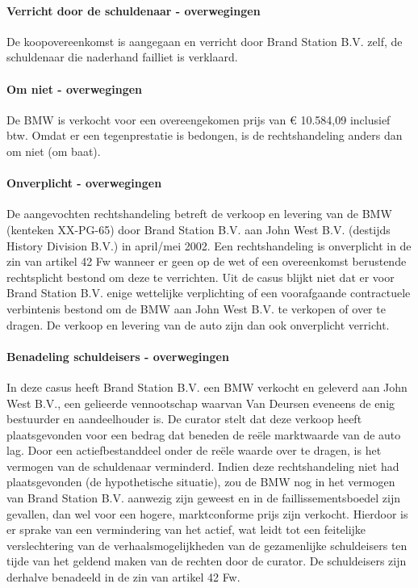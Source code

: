 \documentclass[
  dutch,
  a4paper,
]{article}
\begin{document}
\paragraph{Verricht door de schuldenaar - overwegingen}\label{verricht-door-de-schuldenaar---overwegingen-59}

De koopovereenkomst is aangegaan en verricht door Brand Station B.V. zelf, de schuldenaar die naderhand failliet is verklaard.

\paragraph{Om niet - overwegingen}\label{om-niet---overwegingen-59}

De BMW is verkocht voor een overeengekomen prijs van € 10.584,09 inclusief btw. Omdat er een tegenprestatie is bedongen, is de rechtshandeling anders dan om niet (om baat).

\paragraph{Onverplicht - overwegingen}\label{onverplicht---overwegingen-59}

De aangevochten rechtshandeling betreft de verkoop en levering van de BMW (kenteken XX-PG-65) door Brand Station B.V. aan John West B.V. (destijds History Division B.V.) in april/mei 2002. Een rechtshandeling is onverplicht in de zin van artikel 42 Fw wanneer er geen op de wet of een overeenkomst berustende rechtsplicht bestond om deze te verrichten. Uit de casus blijkt niet dat er voor Brand Station B.V. enige wettelijke verplichting of een voorafgaande contractuele verbintenis bestond om de BMW aan John West B.V. te verkopen of over te dragen. De verkoop en levering van de auto zijn dan ook onverplicht verricht.

\paragraph{Benadeling schuldeisers - overwegingen}\label{benadeling-schuldeisers---overwegingen-59}

In deze casus heeft Brand Station B.V. een BMW verkocht en geleverd aan John West B.V., een gelieerde vennootschap waarvan Van Deursen eveneens de enig bestuurder en aandeelhouder is. De curator stelt dat deze verkoop heeft plaatsgevonden voor een bedrag dat beneden de reële marktwaarde van de auto lag. Door een actiefbestanddeel onder de reële waarde over te dragen, is het vermogen van de schuldenaar verminderd. Indien deze rechtshandeling niet had plaatsgevonden (de hypothetische situatie), zou de BMW nog in het vermogen van Brand Station B.V. aanwezig zijn geweest en in de faillissementsboedel zijn gevallen, dan wel voor een hogere, marktconforme prijs zijn verkocht. Hierdoor is er sprake van een vermindering van het actief, wat leidt tot een feitelijke verslechtering van de verhaalsmogelijkheden van de gezamenlijke schuldeisers ten tijde van het geldend maken van de rechten door de curator. De schuldeisers zijn derhalve benadeeld in de zin van artikel 42 Fw.
\end{document}
